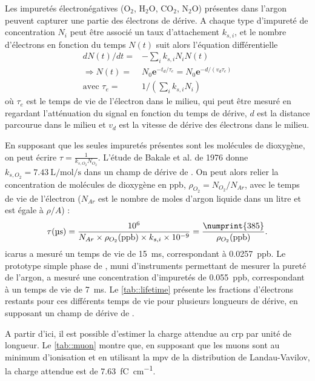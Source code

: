         Les impuretés électronégatives (O$_2$, H$_2$O, CO$_2$, N$_2$O) présentes dans l'argon peuvent capturer une partie des électrons de dérive. A chaque type d'impureté de concentration $N_i$ peut être associé un taux d'attachement $k_{s,i}$, et le nombre d'électrons en fonction du temps $N(t)$ suit alors l'équation différentielle\cite{Buckley1989}
        \begin{eqnarray}\label{eq::e_lifetime}
          dN(t)/dt = & -\sum_{i} k_{s,i}N_i N(t)\\
          \Rightarrow N(t) = & N_0\textbf{e}^{-t_d/\tau_e}=N_0\textbf{e}^{-d/(v_d\tau_e)}\label{eq::losses} \\
          \text{avec } \tau_e = & 1/\left(\sum_{i} k_{s,i}N_i\right)
        \end{eqnarray}
        où $\tau_e$ est le temps de vie de l'électron dans le milieu, qui peut être mesuré en regardant l'atténuation du signal en fonction du temps de dérive, $d$ est la distance parcourue dans le milieu et $v_d$ est la vitesse de dérive des électrons dans le milieu.

        En supposant que les seules impuretés présentes sont les molécules de dioxygène, on peut écrire $\tau = \frac{1}{k_{s,O_2} N_{O_2}}$. L'étude de Bakale et al. de 1976\cite{Bakale1976} donne $k_{s,O_2}=\SI{7.43}{\liter\per\mole\per\second}$ dans un champ de dérive de \driftfield{}. On peut alors relier la concentration de molécules de dioxygène en ppb, $\rho_{O_2}=N_{O_2}/N_{Ar}$, avec le temps de vie de l'électron ($N_{Ar}$ est le nombre de moles d'argon liquide dans un litre et est égale à $\rho/A$) : 
        \begin{equation}\label{eq::purity}
          \tau(\si{\micro\second}) = \frac{10^6}{N_{Ar}\times \rho_{O_2}(\si{ppb}) \times k_{s,i} \times 10^{-9}} = \frac{\numprint{385}}{\rho_{O_2}(\si{ppb})}.
        \end{equation}
        \gls{icarus} a mesuré un temps de vie de \SI{15}{\milli\second}\cite{Antonello2014}, correspondant à \SI{0.0257}{ppb}. Le prototype simple phase de \protosp{}, muni d'instruments permettant de mesurer la pureté de l'argon, a mesuré une concentration d'impuretés de \SI{0.055}{ppb}, correspondant à un temps de vie de \SI{7}{\milli\second}. Le \autoref{tab::lifetime} présente les fractions d'électrons restants pour ces différents temps de vie pour plusieurs longueurs de dérive, en supposant un champ de dérive de \driftfield{}.

        A partir d'ici, il est possible d'estimer la charge attendue au \gls{crp} par unité de longueur. Le \autoref{tab::muon} montre que, en supposant que les muons sont au minimum d'ionisation et en utilisant la \gls{mpv} de la distribution de Landau-Vavilov, la charge attendue est de \SI{7.63}{\femto\coulomb\per\centi\meter}.

